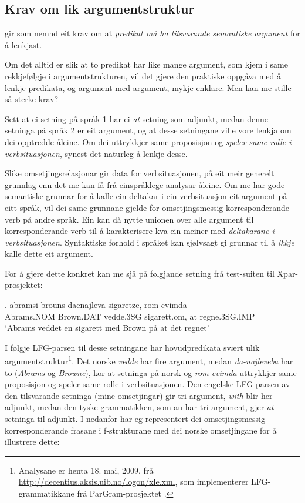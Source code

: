\documentclass[12pt,a4paper,oneside,draft]{report}
\begin{document}
\subsection{Krav om lik argumentstruktur}
\label{sec-3.6.1}

\label{SEC:lik-argstr}

\citet{thunes2003eal} gir som nemnd eit krav om at \emph{predikat må ha tilsvarande semantiske argument} for å lenkjast.

Om det alltid er slik at to predikat har like mange argument, som kjem i
same rekkjefølgje i argumentstrukturen, vil det gjere den praktiske
oppgåva med å lenkje predikata, og argument med argument, mykje
enklare. Men kan me stille så sterke krav?

Sett at ei setning på språk 1 har ei \emph{at}-setning som adjunkt, medan
denne setninga på språk 2 er eit argument, og at desse setningane
ville vore lenkja om dei opptredde åleine. Om dei uttrykkjer same
proposisjon og \emph{speler same rolle i verbsituasjonen}, synest det
naturleg å lenkje desse.

Slike omsetjingsrelasjonar gir data for verbsituasjonen, på eit meir
 generelt grunnlag enn det me kan få frå einspråklege analysar
 åleine. Om me har gode semantiske grunnar for å kalle ein deltakar i
 ein verbsituasjon eit argument på eitt språk, vil dei same grunnane
 gjelde for omsetjingsmessig korresponderande verb på andre språk. Ein
 kan då nytte unionen over alle argument til korresponderande verb til
 å karakterisere kva ein meiner med \emph{deltakarane i  verbsituasjonen}. Syntaktiske forhold i språket kan sjølvsagt gi
 grunnar til å \emph{ikkje} kalle dette eit argument.

For å gjere dette konkret kan me sjå på følgjande setning frå
 test-suiten til Xpar-prosjektet:

\exg. abramsi brouns       daenajleva sigaretze, rom cvimda \label{ex:vedde-gloss} \\
      Abrams.NOM Brown.DAT vedde.3SG sigarett.om, at  regne.3SG.IMP \\
     `Abrams veddet en sigarett med Brown på at det regnet' 

I følgje LFG-parsen til desse setningane har hovudpredikata svært ulik
 argumentstruktur\footnote{Analysane er henta 18. mai, 2009, frå
        \href{http://decentius.aksis.uib.no/logon/xle.xml}{http://decentius.aksis.uib.no/logon/xle.xml}, som implementerer
        LFG-grammatikkane frå ParGram-prosjektet \citep{butt2002pgp}. }. Det norske \emph{vedde} har \underline{fire} argument,
 medan \emph{da-najleveba} har \underline{to} (\emph{Abrams} og \emph{Browne}), kor
 at-setninga på norsk og \emph{rom cvimda} uttrykkjer same proposisjon og
 speler same rolle i verbsituasjonen. Den engelske LFG-parsen av den
 tilsvarande setninga (mine omsetjingar) gir \underline{tri} argument, \emph{with}
 blir her adjunkt, medan den tyske grammatikken, som au har \underline{tri}
 argument, gjer \emph{at}-setninga til adjunkt. I \Next nedanfor har eg
 representert dei omsetjingsmessig korresponderande frasane i
 f\hyp{}strukturane med dei norske omsetjingane for å illustrere dette:
\end{document}
